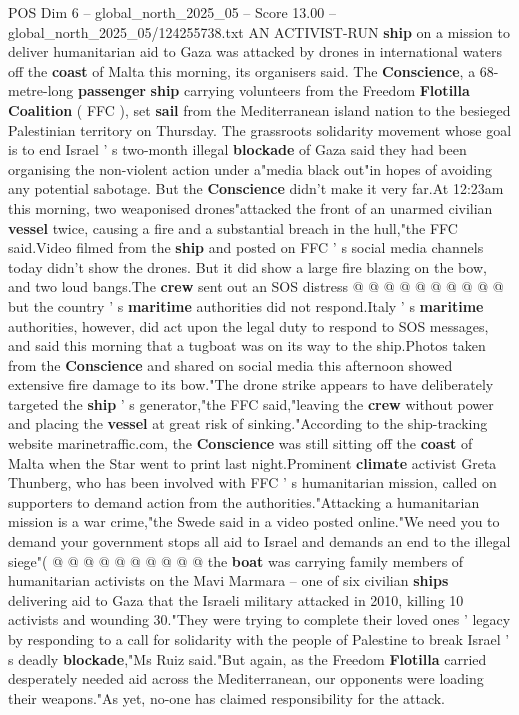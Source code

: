 \begin{textsample}{POS Dim 6 – global\_north\_2025\_05 – Score 13.00 – global\_north\_2025\_05/124255738.txt}  \label{ex:f6_pos_047}
AN ACTIVIST-RUN \textbf{ship} on a mission to deliver humanitarian aid to Gaza was attacked by drones in international waters off the \textbf{coast} of Malta this morning, its organisers said.
The \textbf{Conscience}, a 68-metre-long \textbf{passenger} \textbf{ship} carrying volunteers from the Freedom \textbf{Flotilla} \textbf{Coalition} ( FFC ), set \textbf{sail} from the Mediterranean island nation to the besieged Palestinian territory on Thursday.
The grassroots solidarity movement whose goal is to end Israel ' s two-month illegal \textbf{blockade} of Gaza said they had been organising the non-violent action under a"media black out"in hopes of avoiding any potential sabotage.
But the \textbf{Conscience} didn't make it very far.At 12:23am this morning, two weaponised drones"attacked the front of an unarmed civilian \textbf{vessel} twice, causing a fire and a substantial breach in the hull,"the FFC said.Video filmed from the \textbf{ship} and posted on FFC ' s social media channels today didn't show the drones.
But it did show a large fire blazing on the bow, and two loud bangs.The \textbf{crew} sent out an SOS distress @ @ @ @ @ @ @ @ @ @ but the country ' s \textbf{maritime} authorities did not respond.Italy ' s \textbf{maritime} authorities, however, did act upon the legal duty to respond to SOS messages, and said this morning that a tugboat was on its way to the ship.Photos taken from the \textbf{Conscience} and shared on social media this afternoon showed extensive fire damage to its bow."The drone strike appears to have deliberately targeted the \textbf{ship} ' s generator,"the FFC said,"leaving the \textbf{crew} without power and placing the \textbf{vessel} at great risk of sinking."According to the ship-tracking website marinetraffic.com, the \textbf{Conscience} was still sitting off the \textbf{coast} of Malta when the Star went to print last night.Prominent \textbf{climate} activist Greta Thunberg, who has been involved with FFC ' s humanitarian mission, called on supporters to demand action from the authorities."Attacking a humanitarian mission is a war crime,"the Swede said in a video posted online."We need you to demand your government stops all aid to Israel and demands an end to the illegal siege"( @ @ @ @ @ @ @ @ @ @ the \textbf{boat} was carrying family members of humanitarian activists on the Mavi Marmara -- one of six civilian \textbf{ships} delivering aid to Gaza that the Israeli military attacked in 2010, killing 10 activists and wounding 30."They were trying to complete their loved ones ' legacy by responding to a call for solidarity with the people of Palestine to break Israel ' s deadly \textbf{blockade},"Ms Ruiz said."But again, as the Freedom \textbf{Flotilla} carried desperately needed aid across the Mediterranean, our opponents were loading their weapons."As yet, no-one has claimed responsibility for the attack.

\end{textsample}
